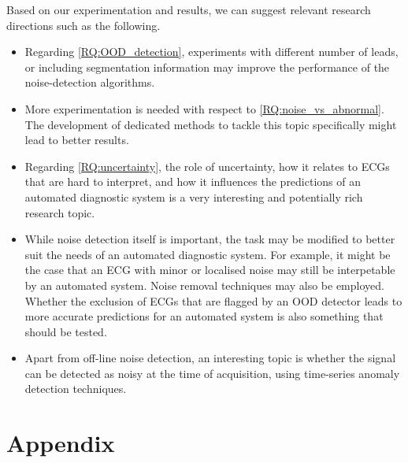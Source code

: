\documentclass[a4paper,10pt]{article}
\begin{document}
Based on our experimentation and results, we can suggest relevant research directions such as the following.
\begin{itemize}
	\item Regarding \ref{RQ:OOD_detection}, experiments with different number of leads, or including segmentation information may improve the performance of the noise-detection algorithms.
	\item More experimentation is needed with respect to \ref{RQ:noise_vs_abnormal}. The development of dedicated methods to tackle this topic specifically might lead to better results.
	\item Regarding \ref{RQ:uncertainty}, the role of uncertainty, how it relates to ECGs that are hard to interpret, and how it influences the predictions of an automated diagnostic system is a very interesting and potentially rich research topic.
	\item While noise detection itself is important, the task may be modified to better suit the needs of an automated diagnostic system. For example, it might be the case that an ECG with minor or localised noise may still be interpetable by an automated system. Noise removal techniques may also be employed. Whether the exclusion of ECGs that are flagged by an OOD detector leads to more accurate predictions for an automated system is also something that should be tested.
	\item Apart from off-line noise detection, an interesting topic is whether the signal can be detected as noisy at the time of acquisition, using time-series anomaly detection techniques.
\end{itemize}




\clearpage
\printbibliography

\clearpage
\section{Appendix}
\label{sec:appendix}
\end{document}
